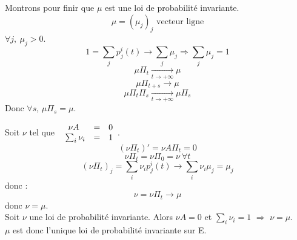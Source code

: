 \begin{dem}
\bigskip
Montrons pour finir que $\mu$ est une loi de probabilité invariante.
	\[\mu=(\mu_j)_j \text{ vecteur ligne}\]
$\forall j,\ \mu_j>0$.
	\[1=\sum_j p^i_j(t) \to \sum_j \mu_j \Rightarrow \sum_j \mu_j=1\]
	\[\mu\Pi_t \xrightarrow[t\to +\infty]{} \mu\]
	\[\mu \Pi_{t+s} \to \mu\]
	\[\mu\Pi_t\Pi_s \xrightarrow[t\to+\infty]{} \mu\Pi_s\]
Donc $\forall s$, $\mu\Pi_s=\mu$.

\bigskip
Soit $\nu$ tel que $\begin{array}{c c c} \nu A&=&0 \\ \sum_i \nu_i&=&1 \end{array}$.
	\[(\nu \Pi_t)'=\nu A\Pi_t=0\]
	\[\nu\Pi_t=\nu\Pi_0=\nu\ \forall t\]
	\[(\nu\Pi_t)_j=\sum_i \nu_ip^i_j(t)\to \sum_i \nu_i\mu_j = \mu_j\]
donc :
	\[\nu=\nu\Pi_t\to \mu\]
donc $\nu=\mu$.\\
Soit $\nu$ une loi de probabilité invariante. Alors $\nu A=0$ et $\sum_i \nu_i=1$ $\Rightarrow$ $\nu=\mu$.\\
$\mu$ est donc l'unique loi de probabilité invariante sur E.
\end{dem}

